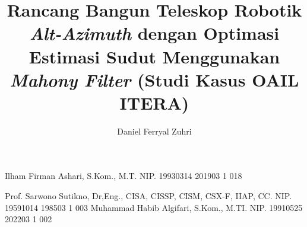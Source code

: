 \documentclass[article]{report} %
\begin{document}
    
    \title{Rancang Bangun Teleskop Robotik \textit{Alt-Azimuth} dengan Optimasi Estimasi Sudut Menggunakan \textit{Mahony Filter} (Studi Kasus OAIL ITERA)}
    
	\author{Daniel Ferryal Zuhri}		%
	
	\dosbingA%
		{Ilham Firman Ashari, S.Kom., M.T.}%
		{NIP. 19930314 201903 1 018}	%
		
	\pengujiA%
		{Prof. Sarwono Sutikno, Dr,Eng., CISA, CISSP, CISM, CSX-F, IIAP, CC.}%
		{NIP. 19591014 198503 1 003}	%
	\pengujiB%
		{Muhammad Habib Algifari, S.Kom., M.TI.}%
		{NIP. 19910525 202203 1 002}	%

	\sloppy %
    \setcounter{page}{1} %
\end{document}

